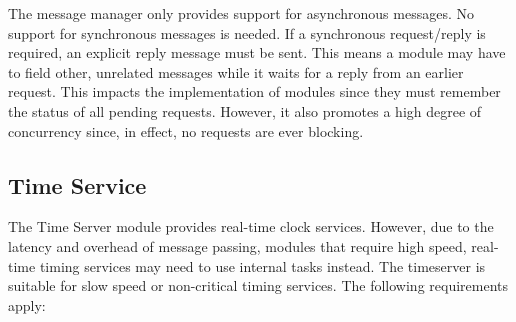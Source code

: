 The message manager only provides support for asynchronous messages. No support for synchronous
messages is needed. If a synchronous request/reply is required, an explicit reply message must
be sent. This means a module may have to field other, unrelated messages while it waits for a
reply from an earlier request. This impacts the implementation of modules since they must
remember the status of all pending requests.  However, it also promotes a high degree of concurrency since, in effect,
no requests are ever blocking.

\subsection{Time Service}
\label{sec:time-service}

The Time Server module provides real-time clock services. However, due to the latency and
overhead of message passing, modules that require high speed, real-time timing services may need
to use internal tasks instead. The timeserver is suitable for slow speed or non-critical timing
services.  The following requirements apply:

